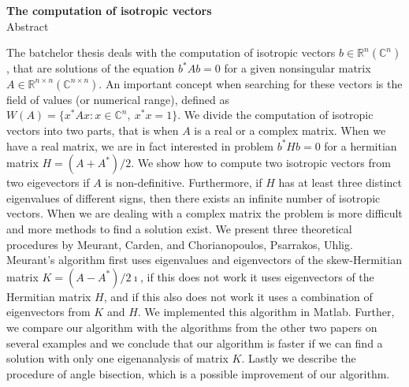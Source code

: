 \documentclass[12pt,a4paper]{amsart}
\theoremstyle{definition}
\theoremstyle{plain}
\newcommand{\R}{\mathbb R}
\newcommand{\C}{\mathbb C}
\begin{document}
\vfill
\begin{center}
{\bf The computation of isotropic vectors}\\[3mm]
{\sc Abstract}
\end{center}
The batchelor thesis deals with the computation of isotropic vectors $b\in\R^{n} (\C^{n})$, that are solutions of the equation $b^\ast Ab=0$ for a given nonsingular matrix $A\in\R^{n\times n} (\C^{n\times n}).$
An important concept when searching for these vectors is the field of values (or numerical range), defined as $W(A)=\{x^\ast Ax\! : x \in \C^n,\ x^\ast x=1\}.$ %
We divide the computation of isotropic vectors into two parts, that is when $A$ is a real or a complex matrix.
When we have a real matrix, we are in fact interested in problem $b^\ast Hb=0$ for a hermitian matrix $H=(A+A^\ast)/2$.
We show how to compute two isotropic vectors from two eigevectors if $A$ is non-definitive. Furthermore, if $H$ has at least three distinct eigenvalues of different signs, then there exists an infinite number of isotropic vectors.
When we are dealing with a complex matrix the problem is more difficult and more methods to find a solution exist. We present three theoretical procedures by Meurant, Carden, and Chorianopoulos, Psarrakos, Uhlig.
Meurant's algorithm first uses eigenvalues and eigenvectors of the skew-Hermitian matrix $K=(A-A^\ast)/2\imath$, if this does not work it uses eigenvectors of the Hermitian matrix $H$, and if this also does not work it uses a combination of eigenvectors from $K$ and $H$.
We implemented this algorithm in Matlab.
Further, we compare our algorithm with the algorithms from the other two papers on several examples and we conclude that our algorithm is faster if we can find a solution with only one eigenanalysis of matrix $K$. %
Lastly we describe the procedure of angle bisection, which is a possible improvement of our algorithm.
\end{document}
